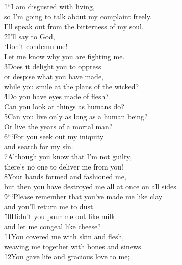 \begin{poetry}
\poeml {}
\v{1}``I am disgusted with living, \\
\poemll    so I'm going to talk about my complaint freely. \\
\poemlll       I'll speak out from the bitterness of my soul. \\
\poeml \v{2}I'll say to God, \\
\poemll    `Don't condemn me! \\
\poemlll       Let me know why you are fighting me. \\
\poeml \v{3}Does it delight you to oppress \\
\poemll    or despise what you have made, \\
\poemlll       while you smile at the plans of the wicked? \\
\poeml \v{4}Do you have eyes made of flesh? \\
\poemll    Can you look at things as humans do? \\
\poeml \v{5}Can you live only as long as a human being? \\
\poemll    Or live the years of a mortal man? \\
\poeml \v{6}```For you seek out my iniquity \\
\poemll    and search for my sin. \\
\poeml \v{7}Although you know that I'm not guilty, \\
\poemll    there's no one to deliver me from you! \\
\poeml \v{8}Your hands formed and fashioned me, \\
\poemll    but then you have destroyed me all at once on all sides. \\
\poeml \v{9}```Please remember that you've made me like clay \\
\poemll    and you'll return me to dust. \\
\poeml \v{10}Didn't you pour me out like milk \\
\poemll    and let me congeal like cheese? \\
\poeml \v{11}You covered me with skin and flesh, \\
\poemll    weaving me together with bones and sinews. \\
\poeml \v{12}You gave life and gracious love to me; \\

\end{poetry}
